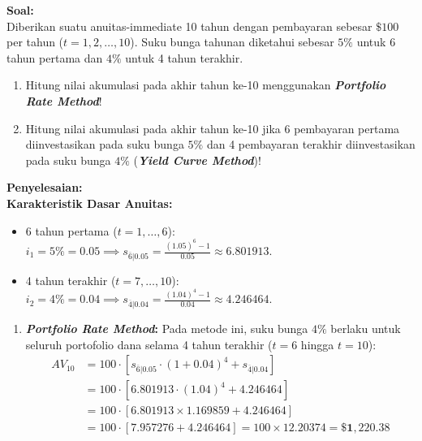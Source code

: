 \documentclass[11pt,a4paper]{article}
\begin{document}
\begin{examplebox}
\textbf{Soal:}\\
Diberikan suatu anuitas-immediate 10 tahun dengan pembayaran sebesar $\$100$ per tahun ($t = 1, 2, \dots, 10$). Suku bunga tahunan diketahui sebesar $5\%$ untuk 6 tahun pertama dan $4\%$ untuk 4 tahun terakhir.
\begin{enumerate}[label=(\alph*)]
    \item Hitung nilai akumulasi pada akhir tahun ke-10 menggunakan \textbf{\textit{Portfolio Rate Method}}!
    \item Hitung nilai akumulasi pada akhir tahun ke-10 jika 6 pembayaran pertama diinvestasikan pada suku bunga $5\%$ dan 4 pembayaran terakhir diinvestasikan pada suku bunga $4\%$ (\textbf{\textit{Yield Curve Method}})!
\end{enumerate}

\vspace{0.5em}
\textbf{Penyelesaian:}\\
\textbf{Karakteristik Dasar Anuitas:}
\begin{itemize}
    \item 6 tahun pertama ($t = 1, \dots, 6$): $i_1 = 5\% = 0.05 \implies s_{\overline{6}|0.05} = \frac{(1.05)^6 - 1}{0.05} \approx 6.801913$.
    \item 4 tahun terakhir ($t = 7, \dots, 10$): $i_2 = 4\% = 0.04 \implies s_{\overline{4}|0.04} = \frac{(1.04)^4 - 1}{0.04} \approx 4.246464$.
\end{itemize}

\begin{enumerate}[label=(\alph*)]
    \item \textbf{\textit{Portfolio Rate Method}:}
    Pada metode ini, suku bunga $4\%$ berlaku untuk seluruh portofolio dana selama 4 tahun terakhir ($t = 6$ hingga $t = 10$):
    \begin{align*}
        AV_{10} &= 100 \cdot \left[ s_{\overline{6}|0.05} \cdot (1 + 0.04)^4 + s_{\overline{4}|0.04} \right] \\[0.4em]
                &= 100 \cdot \left[ 6.801913 \cdot (1.04)^4 + 4.246464 \right] \\[0.4em]
                &= 100 \cdot \left[ 6.801913 \times 1.169859 + 4.246464 \right] \\[0.4em]
                &= 100 \cdot \left[ 7.957276 + 4.246464 \right] = 100 \times 12.20374 = \mathbf{\$1{,}220.38}
    \end{align*}


\end{enumerate}
\end{examplebox}
\end{document}
